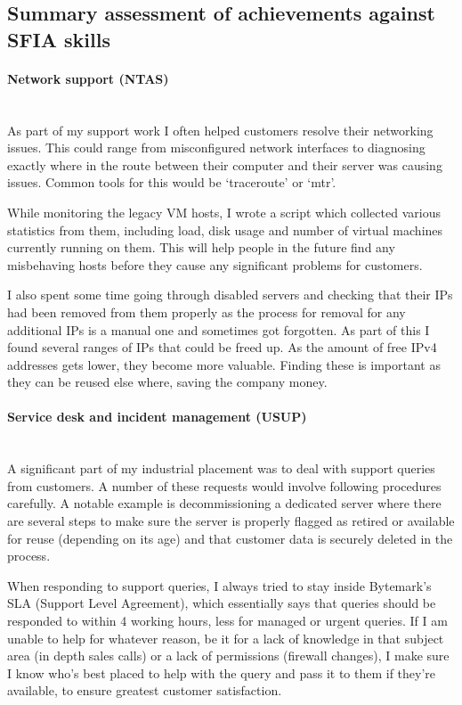 \documentclass[12pt,a4paper]{article}
\newcommand{\paragraphnl}[1]{\paragraph{#1}\mbox{}\\}
\begin{document}
\subsection*{Summary assessment of achievements against SFIA skills}
\paragraphnl{Network support (NTAS)}
	As part of my support work I often helped customers resolve their networking
	issues. This could range from misconfigured network interfaces to diagnosing
	exactly where in the route between their computer and their server was
	causing issues. Common tools for this would be `traceroute' or `mtr'.

	While monitoring the legacy VM hosts, I wrote a script which collected
	various statistics from them, including load, disk usage and number of
	virtual machines currently running on them. This will help people in the
	future find any misbehaving hosts before they cause any significant problems
	for customers.

	I also spent some time going through disabled servers and checking that
	their IPs had been removed from them properly as the process for removal for
	any additional IPs is a manual one and sometimes got forgotten. As part of
	this I found several ranges of IPs that could be freed up. As the amount of
	free IPv4 addresses gets lower, they become more valuable. Finding these is
	important as they can be reused else where, saving the company money.

\paragraphnl{Service desk and incident management (USUP)}
	A significant part of my industrial placement was to deal with support
	queries from customers. A number of these requests would involve following
	procedures carefully. A notable example is decommissioning a dedicated
	server where there are several steps to make sure the server is properly
	flagged as retired or available for reuse (depending on its age) and that
	customer data is securely deleted in the process.

	When responding to support queries, I always tried to stay inside Bytemark's
	SLA (Support Level Agreement), which essentially says that queries should be
	responded to within 4 working hours, less for managed or urgent queries. If
	I am unable to help for whatever reason, be it for a lack of knowledge in
	that subject area (in depth sales calls) or a lack of permissions (firewall
	changes), I make sure I know who's best placed to help with the query and
	pass it to them if they're available, to ensure greatest customer
	satisfaction.
\end{document}
